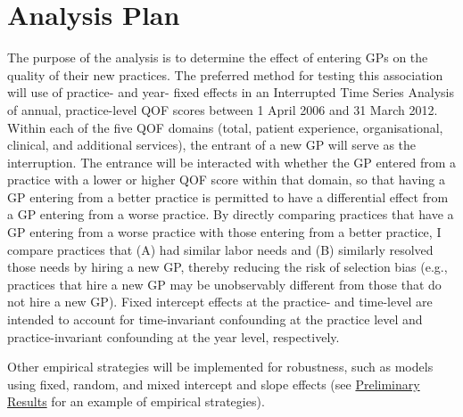 \documentclass[12pt]{article}
\begin{document}
\section{Analysis Plan}

The purpose of the analysis is to determine the effect of entering GPs on the quality of their new practices. The preferred method for testing this association will use of practice- and year- fixed effects in an Interrupted Time Series Analysis of annual, practice-level QOF scores between 1 April 2006 and 31 March 2012. Within each of the five QOF domains (total, patient experience, organisational, clinical, and additional services), the entrant of a new GP will serve as the interruption. The entrance will be interacted with whether the GP entered from a practice with a lower or higher QOF score within that domain, so that having a GP entering from a better practice is permitted to have a differential effect from a GP entering from a worse practice. By directly comparing practices that have a GP entering from a worse practice with those entering from a better practice, I compare practices that (A) had similar labor needs and (B) similarly resolved those needs by hiring a new GP, thereby reducing the risk of selection bias (e.g., practices that hire a new GP may be unobservably different from those that do not hire a new GP). Fixed intercept effects at the practice- and time-level are intended to account for time-invariant confounding at the practice level and practice-invariant confounding at the year level, respectively.

Other empirical strategies will be implemented for robustness, such as models using fixed, random, and mixed intercept and slope effects (see \href{https://www.TheodoreCaputi.com/files/prelims.pdf}{Preliminary Results} for an example of empirical strategies).





\clearpage


\end{document}
